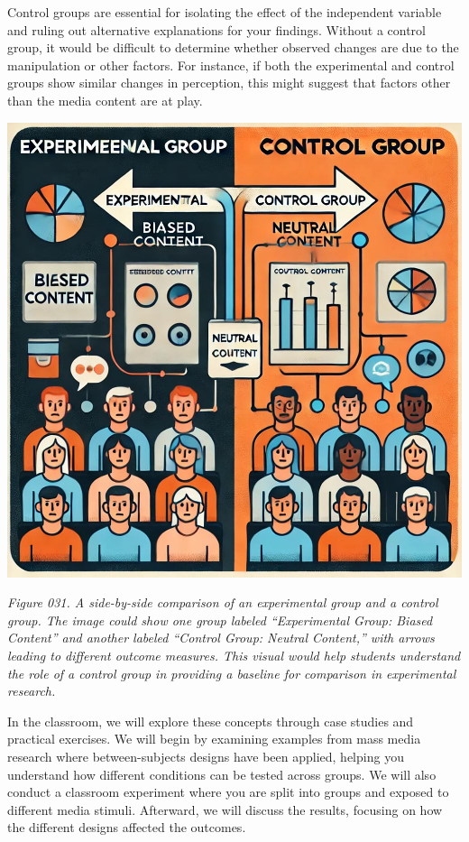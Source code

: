 \documentclass[
]{book}
\begin{document}
Control groups are essential for isolating the effect of the independent variable and ruling out alternative explanations for your findings. Without a control group, it would be difficult to determine whether observed changes are due to the manipulation or other factors. For instance, if both the experimental and control groups show similar changes in perception, this might suggest that factors other than the media content are at play.

\includegraphics[width=1\textwidth,height=\textheight]{images/fig031.jpg}

\emph{Figure 031. A side-by-side comparison of an experimental group and a control group. The image could show one group labeled ``Experimental Group: Biased Content'' and another labeled ``Control Group: Neutral Content,'' with arrows leading to different outcome measures. This visual would help students understand the role of a control group in providing a baseline for comparison in experimental research.}

In the classroom, we will explore these concepts through case studies and practical exercises. We will begin by examining examples from mass media research where between-subjects designs have been applied, helping you understand how different conditions can be tested across groups. We will also conduct a classroom experiment where you are split into groups and exposed to different media stimuli. Afterward, we will discuss the results, focusing on how the different designs affected the outcomes.
\end{document}
